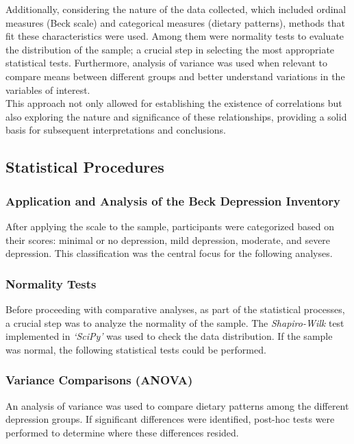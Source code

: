 \documentclass[jou]{apa7}
\begin{document}
Additionally, considering the nature of the data collected, which included ordinal measures (Beck scale) and categorical measures (dietary patterns), methods that fit these characteristics were used. Among them were normality tests to evaluate the distribution of the sample; a crucial step in selecting the most appropriate statistical tests. Furthermore, analysis of variance was used when relevant to compare means between different groups and better understand variations in the variables of interest.\\

This approach not only allowed for establishing the existence of correlations but also exploring the nature and significance of these relationships, providing a solid basis for subsequent interpretations and conclusions.

\subsection{Statistical Procedures}\label{procedimientos-estaduxedsticos}

\subsubsection{Application and Analysis of the Beck Depression Inventory}
After applying the scale to the sample, participants were categorized based on their scores: minimal or no depression, mild depression, moderate, and severe depression. This classification was the central focus for the following analyses.\\

\subsubsection{Normality Tests}
Before proceeding with comparative analyses, as part of the statistical processes, a crucial step was to analyze the normality of the sample. The \emph{Shapiro-Wilk} test implemented in \emph{`SciPy'} was used to check the data distribution. If the sample was normal, the following statistical tests could be performed.\\

\subsubsection{Variance Comparisons (ANOVA)}
An analysis of variance was used to compare dietary patterns among the different depression groups. If significant differences were identified, post-hoc tests were performed to determine where these differences resided.\\
\end{document}
